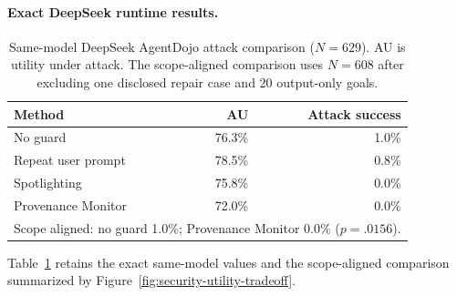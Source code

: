 \documentclass[letterpaper,twocolumn,10pt]{article}
\newcommand{\sys}{Provenance Monitor}
\theoremstyle{definition}
\begin{document}
\paragraph{Exact DeepSeek runtime results.}
\begin{table}[t]
\centering
\scriptsize
\setlength{\tabcolsep}{3pt}
\caption{Same-model DeepSeek AgentDojo attack comparison ($N=629$). AU is
utility under attack. The scope-aligned comparison uses $N=608$ after excluding
one disclosed repair case and 20 output-only goals.}
\label{tab:deepseek-runtime}
\begin{tabular}{lrr}
\toprule
Method & AU & Attack success \\
\midrule
No guard & 76.3\% & 1.0\% \\
Repeat user prompt & 78.5\% & 0.8\% \\
Spotlighting & 75.8\% & 0.0\% \\
\sys{} & 72.0\% & 0.0\% \\
\midrule
\multicolumn{3}{l}{Scope aligned: no guard 1.0\%; \sys{} 0.0\% ($p=.0156$).}\\
\bottomrule
\end{tabular}
\end{table}

Table~\ref{tab:deepseek-runtime} retains the exact same-model values and the
scope-aligned comparison summarized by
Figure~\ref{fig:security-utility-tradeoff}.
\end{document}
